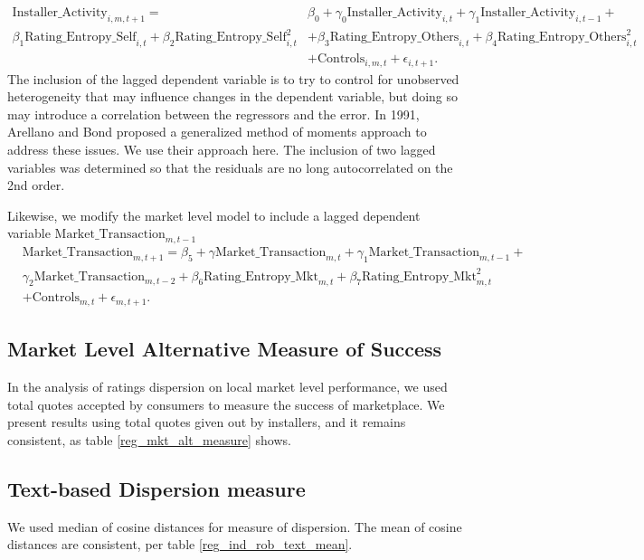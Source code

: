\documentclass[msom,blindrev]{informs3}
\begin{document}
\begin{align} \nonumber
\text{Installer\_Activity}_{i,m,t+1}=&\beta_{0}+\gamma_{0} \text{Installer\_Activity}_{i,t}+\gamma_{1}\text{Installer\_Activity}_{i,t-1}+\\ \nonumber
\beta_{1} \text{Rating\_Entropy\_Self}_{i,t}+\beta_{2} \text{Rating\_Entropy\_Self}_{i,t}^ {2}
&+\beta_{3} \text{Rating\_Entropy\_Others}_{i,t}  +\beta_{4}\text{Rating\_Entropy\_Others}_{i,t}^{2} \\
&+ \text{Controls}_{i,m,t}+ \epsilon_{i,t+1}.
\end{align}
The inclusion of the lagged dependent variable is to try to control for unobserved heterogeneity that may influence changes in the dependent variable, but doing so may introduce a correlation between the regressors and the error. In 1991, Arellano and Bond proposed a generalized method of moments approach to address these issues. We use their approach here. The inclusion of two lagged variables was determined so that the residuals are no long autocorrelated on the 2nd order.


Likewise, we modify the market level model to include a lagged dependent variable $\text{Market\_Transaction}_{m,t-1}$\\
\begin{align} \nonumber&
\text{Market\_Transaction}_{m,t+1}=\beta_{5}+\gamma \text{Market\_Transaction}_{m,t}+\gamma_{1}\text{Market\_Transaction}_{m,t-1}+\\\nonumber&
\gamma_{2} \text{Market\_Transaction}_{m,t-2}+\beta_{6}\text{Rating\_Entropy\_Mkt}_{m,t}+ \beta_{7}\text{Rating\_Entropy\_Mkt}_{m,t} ^2\\\nonumber
&+ \text{Controls}_{m,t}  +\epsilon_{m,t+1}.
\end{align}
\clearpage



\subsection{Market Level Alternative Measure of Success}

In the analysis of ratings dispersion on local market level performance, we used total quotes accepted by consumers to measure the success of marketplace. We present results using total quotes given out by installers, and it remains consistent, as table \ref{reg_mkt_alt_measure} shows.

\subsection{Text-based Dispersion measure}

We used median of cosine distances for measure of dispersion. The mean of cosine distances are consistent, per table \ref{reg_ind_rob_text_mean}.
\end{document}
